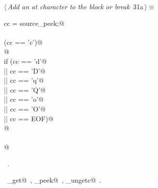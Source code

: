 \documentclass[a4paper]{report}
\begin{document}
\begin{flushleft} \small
\begin{minipage}{\linewidth}\label{scrap52}\raggedright\small
{} $\langle\,${\it Add an at character to the block or break}\nobreak\ {\footnotesize {31a}}$\,\rangle\equiv$
\vspace{-1ex}
\begin{list}{}{} \item
\mbox{}\verb@int cc = source_peek;@\\
\mbox{}\verb@@\\
\mbox{}\verb@if (cc == 'c')@\\
\mbox{}@\\
\mbox{}\verb@else if (cc == 'd'@\\
\mbox{}\verb@         || cc == 'D'@\\
\mbox{}\verb@         || cc == 'q'@\\
\mbox{}\verb@         || cc == 'Q'@\\
\mbox{}\verb@         || cc == 'o'@\\
\mbox{}\verb@         || cc == 'O'@\\
\mbox{}\verb@         || cc == EOF)@\\
\mbox{}@\\
\mbox{}\verb@else@\\
\mbox{}@\\
\mbox{}\verb@@{\NWsep}
\end{list}
\vspace{-1.5ex}
\footnotesize
\begin{list}{}{\setlength{\itemsep}{-\parsep}\setlength{\itemindent}{-\leftmargin}}
\item \NWtxtMacroRefIn\ .
\item \NWtxtIdentsUsed\nobreak\  \verb@source_get@\nobreak\ , \verb@source_peek@\nobreak\ , \verb@source_ungetc@\nobreak\ .
\item{}
\end{list}
\end{minipage}\vspace{4ex}
\end{flushleft}
\end{document}
